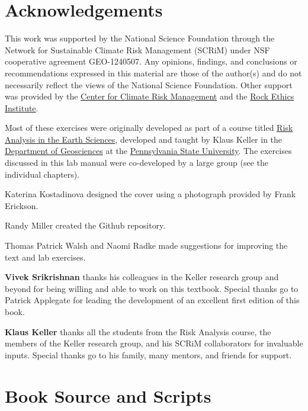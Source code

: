 \documentclass[
  11pt,
]{book}
\begin{document}
\hypertarget{acknowledgements}{%
\section*{Acknowledgements}\label{acknowledgements}}


This work was supported by the National Science Foundation through the Network for Sustainable Climate Risk Management (SCRiM) under NSF cooperative agreement GEO-1240507. Any opinions, findings, and conclusions or recommendations expressed in this material are those of the author(s) and do not necessarily reflect the views of the National Science Foundation. Other support was provided by the \href{http://www.clima.psu.edu/index.php}{Center for Climate Risk Management} and the \href{http://rockethics.psu.edu}{Rock Ethics Institute}.

Most of these exercises were originally developed as part of a course titled \href{http://bulletins.psu.edu/undergrad/courses/G/GEOSC/450/200910SP}{Risk Analysis in the Earth Sciences}, developed and taught by Klaus Keller in the \href{http://www.geosc.psu.edu}{Department of Geosciences} at the \href{http://www.psu.edu}{Pennsylvania State University}. The exercises discussed in this lab manual were co-developed by a large group (see the individual chapters).

Katerina Kostadinova designed the cover using a photograph provided by Frank Erickson.

Randy Miller created the Github repository.

Thomas Patrick Walsh and Naomi Radke made suggestions for improving the text and lab exercises.

\textbf{Vivek Srikrishnan} thanks his colleagues in the Keller research group and beyond for being willing and able to work on this textbook. Special thanks go to Patrick Applegate for leading the development of an excellent first edition of this book.

\textbf{Klaus Keller} thanks all the students from the Risk Analysis course, the members of the Keller research group, and his SCRiM collaborators for invaluable inputs. Special thanks go to his family, many mentors, and friends for support.

\hypertarget{book-source-and-scripts}{%
\section*{Book Source and Scripts}\label{book-source-and-scripts}}
\end{document}
